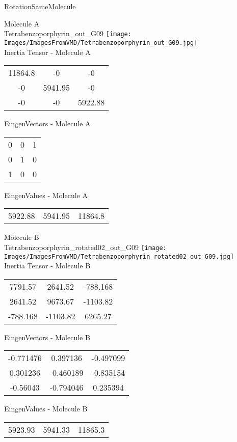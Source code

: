 \vtab[-2cm]
\begin{center}
{\large RotationSameMolecule}
\end{center}
\begin{multicols}{2}
\begin{center}
Molecule A \\ 
Tetrabenzoporphyrin\_out\_G09
\texttt{[image: Images/ImagesFromVMD/Tetrabenzoporphyrin\_out\_G09.jpg]}
\\
Inertia Tensor - Molecule A \\
\vtab
\begin{tabular}{|c c c|}
11864.8	 & 	-0	 & 	-0	 \\
-0	 & 	5941.95	 & 	-0	 \\
-0	 & 	-0	 & 	5922.88
\end{tabular}

\vtab
 EingenVectors - Molecule A     \\
\vtab
\begin{tabular}{|c c c|}
0	 & 	0	 & 	1	 \\
0	 & 	1	 & 	0	 \\
1	 & 	0	 & 	0
\end{tabular}

\vtab
 EingenValues - Molecule A     \\
\vtab
\begin{tabular}{|c c c|}
5922.88	 & 	5941.95	 & 	11864.8
\end{tabular}
\columnbreak

Molecule B \\ 
Tetrabenzoporphyrin\_rotated02\_out\_G09
\texttt{[image: Images/ImagesFromVMD/Tetrabenzoporphyrin\_rotated02\_out\_G09.jpg]}
\\
Inertia Tensor - Molecule B \\
\vtab
\begin{tabular}{|c c c|}
7791.57	 & 	2641.52	 & 	-788.168	 \\
2641.52	 & 	9673.67	 & 	-1103.82	 \\
-788.168	 & 	-1103.82	 & 	6265.27
\end{tabular}

\vtab
 EingenVectors - Molecule B     \\
\vtab
\begin{tabular}{|c c c|}
-0.771476	 & 	0.397136	 & 	-0.497099	 \\
0.301236	 & 	-0.460189	 & 	-0.835154	 \\
-0.56043	 & 	-0.794046	 & 	0.235394
\end{tabular}

\vtab
 EingenValues - Molecule B     \\
\vtab
\begin{tabular}{|c c c|}
5923.93	 & 	5941.33	 & 	11865.3
\end{tabular}

\end{center}
\end{multicols}
